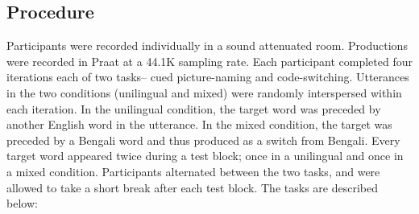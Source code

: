 \documentclass[12 pt]{article}
\begin{document}
\subsection{Procedure} \label{procedure}
Participants were recorded individually in a sound attenuated room. %
Productions were recorded in Praat \citep{boersma2016praat} at a 44.1K sampling rate. Each participant completed four iterations each of two tasks-- cued picture-naming and code-switching. Utterances in the two conditions (unilingual and mixed) were randomly interspersed within each iteration. In the unilingual condition, the target word was preceded by another English word in the utterance. In the mixed condition, the target was preceded by a Bengali word and thus produced as a switch from Bengali. Every target word appeared twice during a test block; once in a unilingual and once in a mixed condition. Participants alternated between the two tasks, and were allowed to take a short break after each test block. The tasks are described below:
\end{document}
